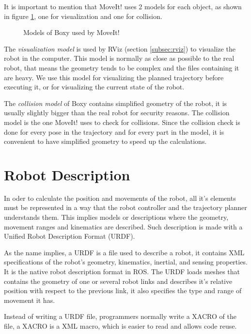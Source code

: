 It is important to mention that MoveIt! uses 2 models for each object, as shown in figure \ref{fig:models}, one for visualization and one for collision. 
\begin{figure}[H]
	\centering
	\begin{subfigure}[][Visualization Model]
		{\texttt{[image: boxy/visual.png]}}
	\end{subfigure}
	\begin{subfigure}[][Collision Model]
		{\texttt{[image: boxy/collision.png]}}
	\end{subfigure}
	\vspace{-15pt}
	\caption{Models of Boxy used by MoveIt!}
	\vspace{-10pt}
	\label{fig:models}
\end{figure}

The \textit{visualization model} is used by RViz (section \ref{subsec:rviz}) to visualize the robot in the computer. This model is normally as close as possible to the real robot, that means the geometry tends to be complex and the files containing it are heavy. We use this model for visualizing the planned trajectory before executing it, or for visualizing the current state of the robot.

The \textit{collision model} of Boxy contains simplified geometry of the robot, it is usually slightly bigger than the real robot for security reasons. The collision model is the one MoveIt! uses to check for collisions. Since the collision check is done for every pose in the trajectory and for every part in the model, it is convenient to have simplified geometry to speed up the calculations. 

\section{Robot Description}
\label{sec:urdf}

In oder to calculate the position and movements of the robot, all it's elements must be  represented in a way that the robot controller and the trajectory planner understands them. This implies models or descriptions where the geometry, movement ranges and kinematics are described. Such description is made with a Unified Robot Description Format (URDF).

As the name implies, a URDF is a file used to describe a robot, it contains XML specifications of the robot's geometry, kinematics, inertial, and sensing properties. It is the native robot description format in ROS. The URDF loads meshes that contains the geometry of one or several robot links and describes it's relative position with respect to the previous link, it also specifies the type and range of movement it has.

Instead of writing a URDF file, programmers normally write a XACRO of the file, a XACRO is a XML macro, which is easier to read and allows code reuse. 
